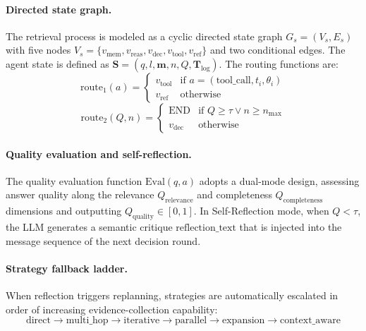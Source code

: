\documentclass[runningheads]{llncs}
\begin{document}
\paragraph{Directed state graph.}
The retrieval process is modeled as a cyclic directed state graph $G_s = (V_s, E_s)$ with five nodes $V_s = \{v_{\text{mem}}, v_{\text{reas}}, v_{\text{dec}}, v_{\text{tool}}, v_{\text{ref}}\}$ and two conditional edges. The agent state is defined as $\mathbf{S} = (q, l, \mathbf{m}, n, Q, \mathbf{T}_{\log})$. The routing functions are:
\begin{equation}
    \text{route}_1(a) = \begin{cases}
    v_{\text{tool}} & \text{if } a = (\text{tool\_call}, t_i, \theta_i) \\
    v_{\text{ref}} & \text{otherwise}
    \end{cases}
\end{equation}
\begin{equation}
    \text{route}_2(Q, n) = \begin{cases}
    \text{END} & \text{if } Q \geq \tau \vee n \geq n_{\max} \\
    v_{\text{dec}} & \text{otherwise}
    \end{cases}
\end{equation}

\paragraph{Quality evaluation and self-reflection.}
The quality evaluation function $\text{Eval}(q, a)$ adopts a dual-mode design, assessing answer quality along the relevance $Q_{\text{relevance}}$ and completeness $Q_{\text{completeness}}$ dimensions and outputting $Q_{\text{quality}} \in [0,1]$. In Self-Reflection mode, when $Q < \tau$, the LLM generates a semantic critique $\text{reflection\_text}$ that is injected into the message sequence of the next decision round.

\paragraph{Strategy fallback ladder.}
When reflection triggers replanning, strategies are automatically escalated in order of increasing evidence-collection capability:
\begin{equation}
    \text{direct} \to \text{multi\_hop} \to \text{iterative} \to \text{parallel} \to \text{expansion} \to \text{context\_aware}
\end{equation}
\end{document}
